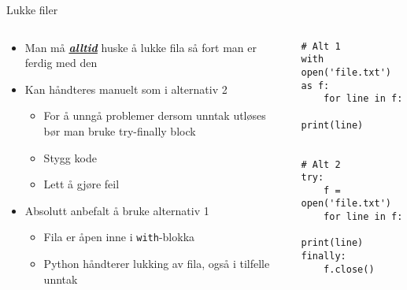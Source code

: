\documentclass[screen, aspectratio=169]{beamer}
\begin{document}
\begin{frame}[fragile]{Lukke filer}
	\begin{columns}
		\begin{column}{.5\textwidth}
			\begin{itemize}
				\item Man må \textbf{\underline{\textit{alltid}}} huske å lukke fila så fort man er ferdig med den
				\item Kan håndteres manuelt som i alternativ 2
				\begin{itemize}
					\item For å unngå problemer dersom unntak utløses bør man bruke try-finally block
					\item Stygg kode
					\item Lett å gjøre feil
				\end{itemize}
				\item Absolutt anbefalt å bruke alternativ 1
				\begin{itemize}
					\item Fila er åpen inne i \lstinline|with|-blokka
					\item Python håndterer lukking av fila, også i tilfelle unntak
				\end{itemize}
			\end{itemize}
		\end{column}
		\begin{column}{.5\textwidth}
			\begin{lstlisting}
# Alt 1
with open('file.txt') as f:
	for line in f:
		print(line)


# Alt 2
try:
	f = open('file.txt')
	for line in f:
		print(line)
finally:
	f.close()
			\end{lstlisting}
		\end{column}
	\end{columns}
\end{frame}
\end{document}
